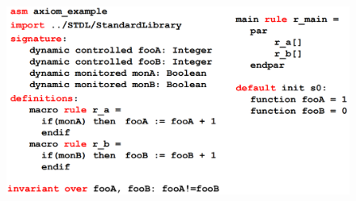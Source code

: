 \documentclass{report}
\begin{document}
\begin{figure}[H]
    \includegraphics[width=0.8\linewidth]{chapters/1-asm/images/axiomex.png}
\end{figure}
\end{document}
